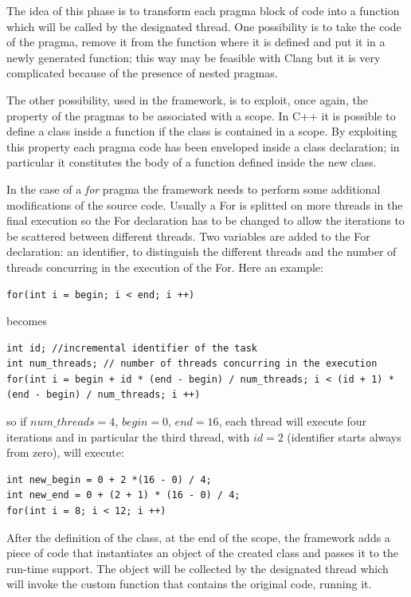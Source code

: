 \documentclass[a4paper,12pt,oneside]{book}
\begin{document}
The idea of this phase is to transform each pragma block of code into a function which will be called by the designated thread. One possibility is to take the code of the pragma, remove it from the function where it is defined and put it in a newly generated function; this way may be feasible with Clang but it is very complicated because of the presence of nested pragmas. 

The other possibility, used in the framework, is to exploit, once again, the property of the pragmas to be associated with a scope. In C++ it is possible to define a class inside a function if the class is contained in a scope. By exploiting this property each pragma code has been enveloped inside a class declaration; in particular it constitutes the body of a function defined inside the new class.

In the case of a \emph{for} pragma the framework needs to perform some additional modifications of the source code. Usually a For is splitted on more threads in the final execution so the For declaration has to be changed to allow the iterations to be scattered between different threads. Two variables are added to the For declaration: an identifier, to distinguish the different threads and the number of threads concurring in the execution of the For. Here an example:

\begin{lstlisting}[language=CCC]
for(int i = begin; i < end; i ++)
\end{lstlisting}
becomes
\begin{lstlisting}[language=CCC]
int id; //incremental identifier of the task
int num_threads; // number of threads concurring in the execution
for(int i = begin + id * (end - begin) / num_threads; i < (id + 1) * (end - begin) / num_threads; i ++)
\end{lstlisting}
so if $num\_threads  = 4$, $begin = 0$, $end = 16$, each thread will execute four iterations and in particular the third thread, with $id = 2$ (identifier starts always from zero), will execute:
\begin{lstlisting}[language=CCC]
int new_begin = 0 + 2 *(16 - 0) / 4;
int new_end = 0 + (2 + 1) * (16 - 0) / 4;
for(int i = 8; i < 12; i ++)
\end{lstlisting}

After the definition of the class, at the end of the scope, the framework adds a piece of code that instantiates an object of the created class and passes it to the run-time support. The object will be collected by the designated thread which will invoke the custom function that contains the original code, running it. 
\end{document}
